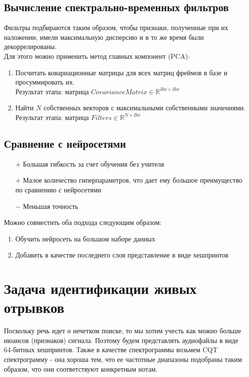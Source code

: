 \subsection{Вычисление спектрально-временных фильтров}
Фильтры подбираются таким образом, чтобы признаки, полученные при их наложении,
имели максимальную дисперсию и в то же время были декоррелированы.\\
Для этого можно применить метод главных компонент (PCA):
\begin{enumerate}[label=\arabic*.]
    \item Посчитать ковариационные матрицы для всех матриц фреймов в базе
    и просуммировать их.\\
    Результат этапа: матрица $CovarianceMatrix \in \mathbb{R}^{Bw \times Bw}$
    \item Найти $N$ собственных векторов с максимальными собственными значениями.\\
    Результат этапа: матрица $Filters \in \mathbb{R}^{N \times Bw}$
\end{enumerate}

\subsection{Сравнение с нейросетями}
\begin{itemize}
    \item[$+$] Большая гибкость за счет обучения без учителя
    \item[$+$] Малое количество гиперпараметров, что дает ему большое преимущество по сравнению
    с нейросетями
    \item[$-$] Меньшая точность
\end{itemize}

Можно совместить оба подхода следующим образом:
\begin{enumerate}[label=\arabic*.]
    \item Обучить нейросеть на большом наборе данных
    \item Добавить в качестве последнего слоя представление в виде хешпринтов
\end{enumerate}

\section{Задача идентификации живых отрывков}
Поскольку речь идет о нечетком поиске, то мы хотим учесть как можно
больше нюансов (признаков) сигнала. Поэтому будем представлять аудиофайлы в виде
64-битных хешпринтов. Также в качестве спектрограммы возьмем CQT спектрограмму -
она хороша тем, что ее частотные диапазоны подобраны таким образом, что они
соответствуют конкретным нотам.

